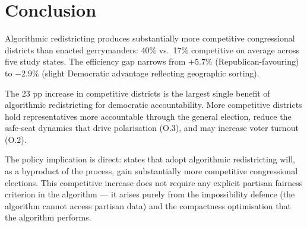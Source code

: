 \section{Conclusion}

Algorithmic redistricting produces substantially more competitive congressional
districts than enacted gerrymanders: 40\% vs.\ 17\% competitive on average
across five study states.
The efficiency gap narrows from $+5.7\%$ (Republican-favouring) to $-2.9\%$
(slight Democratic advantage reflecting geographic sorting).

The 23 pp increase in competitive districts is the largest single benefit
of algorithmic redistricting for democratic accountability.
More competitive districts hold representatives more accountable through the
general election, reduce the safe-seat dynamics that drive polarisation
(O.3), and may increase voter turnout (O.2).

The policy implication is direct: states that adopt algorithmic redistricting
will, as a byproduct of the process, gain substantially more competitive
congressional elections.
This competitive increase does not require any explicit partisan fairness
criterion in the algorithm --- it arises purely from the impossibility
defence (the algorithm cannot access partisan data) and the compactness
optimisation that the algorithm performs.
